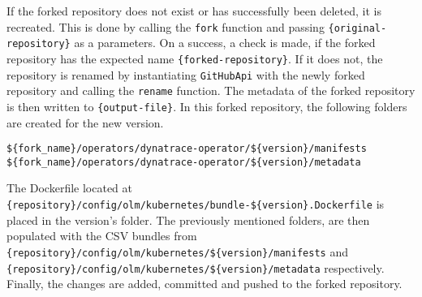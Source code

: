 If the forked repository does not exist or has successfully been deleted, it is recreated.
This is done by calling the \verb|fork| function and passing \verb|{original-repository}| as a parameters.
On a success, a check is made, if the forked repository has the expected name \verb|{forked-repository}|.
If it does not, the repository is renamed by instantiating \verb|GitHubApi| with the newly forked repository and calling the \verb|rename| function.
The metadata of the forked repository is then written to \verb|{output-file}|.
In this forked repository, the following folders are created for the new version.

\begin{verbatim}
${fork_name}/operators/dynatrace-operator/${version}/manifests
${fork_name}/operators/dynatrace-operator/${version}/metadata
\end{verbatim}

The Dockerfile located at \verb|{repository}/config/olm/kubernetes/bundle-${version}.Dockerfile| is placed in the version's folder.
The previously mentioned folders, are then populated with the CSV bundles from \verb|{repository}/config/olm/kubernetes/${version}/manifests| and \verb|{repository}/config/olm/kubernetes/${version}/metadata| respectively.
Finally, the changes are added, committed and pushed to the forked repository.
